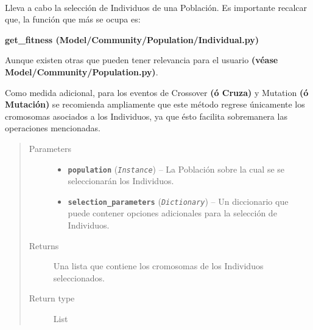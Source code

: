 \documentclass[letterpaper,10pt,english]{sphinxmanual}
\begin{document}
\begin{fulllineitems}
~
\begin{DUlineblock}{0em}
\item[] Lleva a cabo la selección de Individuos de una Población. Es importante recalcar que, la función que
más se ocupa es:
\end{DUlineblock}

\begin{center}\textbf{get\_fitness (Model/Community/Population/Individual.py)}
\end{center}
\begin{DUlineblock}{0em}
\item[] Aunque existen otras que pueden tener relevancia para el usuario \textbf{(véase Model/Community/Population.py)}.
\item[] Como medida adicional, para los eventos de Crossover \textbf{(ó Cruza)} y Mutation \textbf{(ó Mutación)} se recomienda
ampliamente que este método regrese únicamente los cromosomas asociados a los Individuos, ya que ésto facilita sobremanera
las operaciones mencionadas.
\end{DUlineblock}
\begin{quote}\begin{description}
\item[{Parameters}] \leavevmode\begin{itemize}
\item {} 
\textbf{\texttt{population}} (\emph{\texttt{Instance}}) -- La Población sobre la cual se se seleccionarán los Individuos.

\item {} 
\textbf{\texttt{selection\_parameters}} (\emph{\texttt{Dictionary}}) -- Un diccionario que puede contener opciones adicionales para la
selección de Individuos.

\end{itemize}

\item[{Returns}] \leavevmode
Una lista que contiene los cromosomas de los Individuos seleccionados.

\item[{Return type}] \leavevmode
List

\end{description}\end{quote}

\end{fulllineitems}
\end{document}
